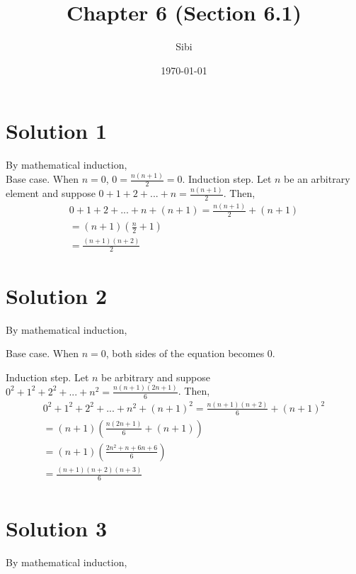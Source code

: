 \documentclass{article}
\begin{document}
\title{Chapter 6 (Section 6.1)}
\author{Sibi}
\date{\today}
\maketitle

\DeclarePairedDelimiter\abs{\lvert}{\rvert}%
\DeclarePairedDelimiter\norm{\lVert}{\rVert}%

\makeatletter
\let\oldabs\abs
\def\abs{\@ifstar{\oldabs}{\oldabs*}}
%
\let\oldnorm\norm
\def\norm{\@ifstar{\oldnorm}{\oldnorm*}}
\makeatother
\newpage

\section{Solution 1}
By mathematical induction, \\
Base case. When $n = 0$, $0 = \frac{n(n+1)}{2} = 0$.
Induction step. Let $n$ be an arbitrary element and suppose $0 + 1 + 2
+ ... + n = \frac{n(n+1)}{2}$. Then,
\begin{align*}
  0 + 1 + 2 + ... + n + (n + 1) = \frac{n(n+1)}{2} + (n + 1) \\
  = (n+1)(\frac{n}{2} + 1) \\
  = \frac{(n+1)(n+2)}{2}
\end{align*}

\section{Solution 2}
By mathematical induction,

Base case. When $n = 0$, both sides of the equation becomes $0$.

Induction step. Let $n$ be arbitrary and suppose $0^2 + 1^2 + 2^2 +
... + n^2 = \frac{n(n+1)(2n+1)}{6}$. Then,
\begin{align*}
  0^2 + 1^2 + 2^2 + ... + n^2 + (n+1)^2 = \frac{n(n+1)(n+2)}{6} + (n +
  1)^2 \\
  = (n+1)(\frac{n(2n + 1)}{6} + (n + 1)) \\
  = (n+1)(\frac{2n^2 + n + 6n + 6}{6}) \\
  = \frac{(n+1)(n+2)(n+3)}{6} \\
\end{align*}
\section{Solution 3}
By mathematical induction,
\end{document}
